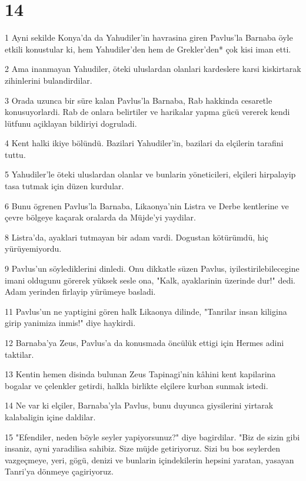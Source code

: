 \chapter{14}

\par 1 Ayni sekilde Konya'da da Yahudiler'in havrasina giren Pavlus'la Barnaba öyle etkili konustular ki, hem Yahudiler'den hem de Grekler'den* çok kisi iman etti.
\par 2 Ama inanmayan Yahudiler, öteki uluslardan olanlari kardeslere karsi kiskirtarak zihinlerini bulandirdilar.
\par 3 Orada uzunca bir süre kalan Pavlus'la Barnaba, Rab hakkinda cesaretle konusuyorlardi. Rab de onlara belirtiler ve harikalar yapma gücü vererek kendi lütfunu açiklayan bildiriyi dogruladi.
\par 4 Kent halki ikiye bölündü. Bazilari Yahudiler'in, bazilari da elçilerin tarafini tuttu.
\par 5 Yahudiler'le öteki uluslardan olanlar ve bunlarin yöneticileri, elçileri hirpalayip tasa tutmak için düzen kurdular.
\par 6 Bunu ögrenen Pavlus'la Barnaba, Likaonya'nin Listra ve Derbe kentlerine ve çevre bölgeye kaçarak oralarda da Müjde'yi yaydilar.
\par 8 Listra'da, ayaklari tutmayan bir adam vardi. Dogustan kötürümdü, hiç yürüyemiyordu.
\par 9 Pavlus'un söylediklerini dinledi. Onu dikkatle süzen Pavlus, iyilestirilebilecegine imani oldugunu görerek yüksek sesle ona, "Kalk, ayaklarinin üzerinde dur!" dedi. Adam yerinden firlayip yürümeye basladi.
\par 11 Pavlus'un ne yaptigini gören halk Likaonya dilinde, "Tanrilar insan kiligina girip yanimiza inmis!" diye haykirdi.
\par 12 Barnaba'ya Zeus, Pavlus'a da konusmada öncülük ettigi için Hermes adini taktilar.
\par 13 Kentin hemen disinda bulunan Zeus Tapinagi'nin kâhini kent kapilarina bogalar ve çelenkler getirdi, halkla birlikte elçilere kurban sunmak istedi.
\par 14 Ne var ki elçiler, Barnaba'yla Pavlus, bunu duyunca giysilerini yirtarak kalabaligin içine daldilar.
\par 15 "Efendiler, neden böyle seyler yapiyorsunuz?" diye bagirdilar. "Biz de sizin gibi insaniz, ayni yaradilisa sahibiz. Size müjde getiriyoruz. Sizi bu bos seylerden vazgeçmeye, yeri, gögü, denizi ve bunlarin içindekilerin hepsini yaratan, yasayan Tanri'ya dönmeye çagiriyoruz.
